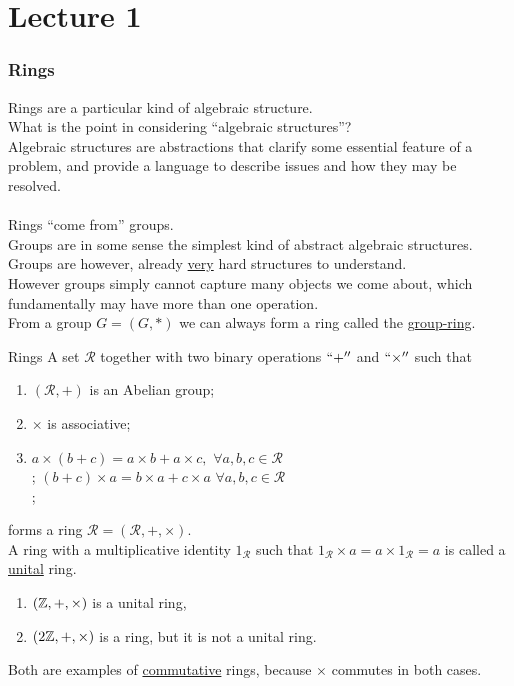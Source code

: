 \documentclass[twoside, openright, fontsize=10pt, headings=big]{scrbook}
\newcommand{\addunumberedsubsec}[1]{%
    \subsection*{#1}%
    \addcontentsline{toc}{subsection}{#1}%
}
\begin{document}
\let\cleardoublepage\clearpage


\frontmatter
\tableofcontents
\mainmatter

\chapter{Lecture 1}
\addunumberedsubsec{Rings}
Rings are a particular kind of algebraic structure.\\
What is the point in considering ``algebraic structures''?\\
Algebraic structures are abstractions that clarify some essential feature of a problem, and provide a language to describe issues and how they may be resolved.\\
\\
Rings ``come from'' groups.\\
Groups are in some sense the simplest kind of abstract algebraic structures.\\
Groups are however, already \underline{very} hard structures to understand.\\
However groups simply cannot capture many objects we come about, which fundamentally may have more than one operation.\\
From a group $G=(G,\ast)$ we can always form a ring called the \underline{group-ring}.\\
\begin{definition}{Rings}{}
    A set $\mathcal{R}$ together with two binary operations $``+''$ and $``\times''$ such that
    \begin{enumerate}
        \item $(\mathcal{R},+)$ is an Abelian group;
        \item $\times$ is associative;
        \item $a\times(b+c)=a\times b + a\times c,$ $\forall a,b,c\in \mathcal{R}$\\;
              $(b+c)\times a=b\times a + c\times a$ $\forall a,b,c\in \mathcal{R}$\\;
    \end{enumerate}
    forms a ring $\mathcal{R}=(\mathcal{R},+,\times)$.\\
    A ring with a multiplicative identity $1_\mathcal{R}$ such that $1_\mathcal{R}\times a=a\times1_\mathcal{R}=a$ is called a \underline{unital} ring.
\end{definition}
\begin{example}{}{}
    \begin{enumerate}
        \item $(\mathbb{Z},+,\times)$ is a unital ring,
        \item $(2\mathbb{Z},+,\times)$ is a ring, but it is not a unital ring.
    \end{enumerate}
    Both are examples of \underline{commutative} rings, because $\times$ commutes in both cases.
\end{example}
\end{document}
